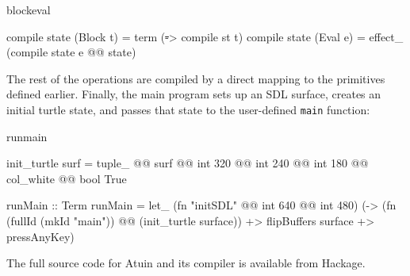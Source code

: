 \begin{SaveVerbatim}{blockeval}

compile state (Block t) = term (\st -> compile st t)
compile state (Eval e)  = effect_ (compile state e @@ state)

\end{SaveVerbatim}

\noindent
The rest of the operations are compiled by a direct mapping to the
primitives defined earlier. Finally, the main program sets up an SDL
surface, creates an initial turtle state, and passes that state to the
user-defined \texttt{main} function:

\begin{SaveVerbatim}{runmain}

init_turtle surf = tuple_ @@ surf @@ int 320 @@ int 240 @@ 
                                     int 180 @@ col_white @@ bool True

runMain :: Term
runMain = let_ (fn "initSDL" @@ int 640 @@ int 480)
          (\surface -> 
            (fn (fullId (mkId "main")) @@ (init_turtle surface)) +>
             flipBuffers surface +> pressAnyKey)

\end{SaveVerbatim}

\noindent
The full source code for Atuin and its compiler is available from
Hackage.
